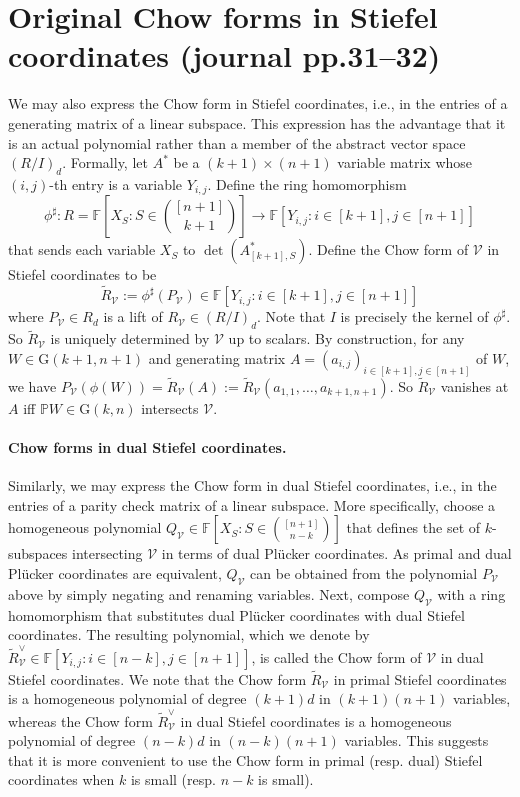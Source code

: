 \documentclass[10pt,a4paper]{article}
\newcommand{\FF}{\mathbb F}
\newcommand{\PP}{\mathbb P}
\newcommand{\GG}{\mathrm G}
\begin{document}
\section*{Original Chow forms in Stiefel coordinates (journal pp.31--32)}
We may also express the Chow form in Stiefel coordinates, i.e., in the entries of a generating matrix of a linear subspace. This expression has the advantage that it is an actual polynomial rather than a member of the abstract vector space $(R/I)_d$.
Formally, let $A^*$ be a $(k+1)\times(n+1)$ variable matrix whose $(i,j)$-th entry is a variable $Y_{i,j}$. Define the ring homomorphism
\[\phi^\sharp:R=\FF[X_S:S\in\binom{[n+1]}{k+1}]\to\FF[Y_{i,j}:i\in[k+1],j\in[n+1]]\]
that sends each variable $X_S$ to $\det(A^*_{[k+1],S})$. Define the Chow form of $\mathcal V$ in Stiefel coordinates to be
\[\widetilde R_{\mathcal V}:=\phi^\sharp(P_{\mathcal V})\in\FF[Y_{i,j}:i\in[k+1],j\in[n+1]]\]
where $P_{\mathcal V}\in R_d$ is a lift of $R_{\mathcal V}\in(R/I)_d$. Note that $I$ is precisely the kernel of $\phi^\sharp$. So $\widetilde R_{\mathcal V}$ is uniquely determined by $\mathcal V$ up to scalars. By construction, for any $W\in\GG(k+1,n+1)$ and generating matrix $A=(a_{i,j})_{i\in[k+1],j\in[n+1]}$ of $W$, we have $P_{\mathcal V}(\phi(W))=\widetilde R_{\mathcal V}(A):=\widetilde R_{\mathcal V}(a_{1,1},\ldots,a_{k+1,n+1})$. So $\widetilde R_{\mathcal V}$ vanishes at $A$ iff $\PP W\in\GG(k,n)$ intersects $\mathcal V$.
\paragraph{Chow forms in dual Stiefel coordinates.}
Similarly, we may express the Chow form in dual Stiefel coordinates, i.e., in the entries of a parity check matrix of a linear subspace.
More specifically, choose a homogeneous polynomial $Q_{\mathcal V}\in\FF[X_S:S\in\binom{[n+1]}{n-k}]$ that defines the set of $k$-subspaces intersecting $\mathcal V$ in terms of dual Pl\"ucker coordinates. As primal and dual Pl\"ucker coordinates are equivalent, $Q_{\mathcal V}$ can be obtained from the polynomial $P_{\mathcal V}$ above by simply negating and renaming variables. Next, compose $Q_{\mathcal V}$ with a ring homomorphism that substitutes dual Pl\"ucker coordinates with dual Stiefel coordinates. The resulting polynomial, which we denote by $\widetilde R^\vee_{\mathcal V}\in\FF[Y_{i,j}:i\in[n-k],j\in[n+1]]$, is called the Chow form of $\mathcal V$ in dual Stiefel coordinates.
We note that the Chow form $\widetilde R_{\mathcal V}$ in primal Stiefel coordinates is a homogeneous polynomial of degree $(k+1)d$ in $(k+1)(n+1)$ variables, whereas the Chow form $\widetilde R^\vee_{\mathcal V}$ in dual Stiefel coordinates is a homogeneous polynomial of degree $(n-k)d$ in $(n-k)(n+1)$ variables. This suggests that it is more convenient to use the Chow form in primal (resp. dual) Stiefel coordinates when $k$ is small (resp. $n-k$ is small).
\end{document}

